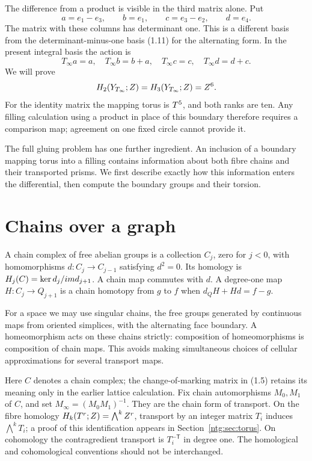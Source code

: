 The difference from a product is visible in the third matrix alone.
Put
\begin{equation}\label{ntg:eq:shear-basis}
 a=e_1-e_3,\qquad b=e_1,\qquad c=e_3-e_2,\qquad d=e_4.
\end{equation}
The matrix with these columns has determinant one. This is a different
basis from the determinant-minus-one basis (1.11) for the alternating
form. In the present integral basis the action is
\begin{equation}\label{ntg:eq:shear}
 T_\infty a=a,\quad T_\infty b=b+a,\quad
 T_\infty c=c,\quad T_\infty d=d+c.
\end{equation}
We will prove
\[
 H_2(Y_{T_\infty};Z)=H_3(Y_{T_\infty};Z)=Z^6.
\]
For the identity matrix the mapping torus is $T^5$, and both ranks
are ten. Any filling calculation using a product in place of this
boundary therefore requires a comparison map; agreement on one fixed
circle cannot provide it.

The full gluing problem has one further ingredient. An inclusion of a
boundary mapping torus into a filling contains information about both
fibre chains and their transported prisms. We first describe exactly
how this information enters the differential, then compute the boundary
groups and their torsion.

\section{Chains over a graph}

A chain complex of free abelian groups is a collection $C_j$, zero
for $j<0$, with homomorphisms $d:C_j\to C_{j-1}$ satisfying $d^2=0$.
Its homology is $H_j(C)=\ker d_j/im d_{j+1}$. A chain map commutes
with $d$. A degree-one map $H:C_j\to Q_{j+1}$ is a chain homotopy
from $g$ to $f$ when $d_QH+Hd=f-g$.

For a space we may use singular chains, the free groups generated by
continuous maps from oriented simplices, with the alternating face
boundary. A homeomorphism acts on these chains strictly: composition
of homeomorphisms is composition of chain maps. This avoids making
simultaneous choices of cellular approximations for several transport
maps.

Here $C$ denotes a chain complex; the change-of-marking matrix in
(1.5) retains its meaning only in the earlier lattice calculation.
Fix chain automorphisms $M_0,M_1$ of $C$, and set
$M_\infty=(M_0M_1)^{-1}$. They are the chain form of transport.
On the fibre homology $H_k(T^r;Z)=\bigwedge^kZ^r$, transport by
an integer matrix $T_i$ induces $\bigwedge^kT_i$; a proof of this
identification appears in Section~\ref{ntg:sec:torus}. On cohomology the
contragredient transport is $T_i^{-\mathsf T}$ in degree one. The
homological and cohomological conventions should not be interchanged.

